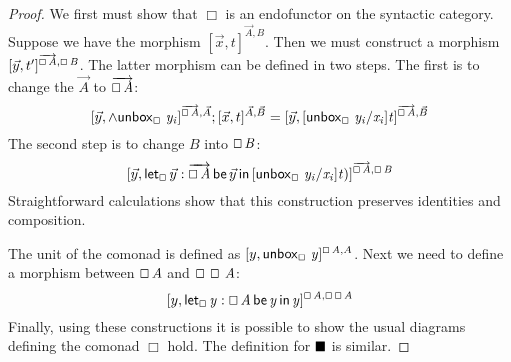 \begin{proof}
  We first must show that $\Box$ is an endofunctor on the syntactic
  category.  Suppose we have the morphism
  $[\vec{x},t]^{\vec{A},B}$.  Then we must construct a morphism
  $[\vec{y},t']^{\overrightarrow{\oblong \, \mathit{A}},\oblong \, \mathit{B}}$.  The latter morphism can be defined in two steps.
  The first is to change the $\vec{A}$ to $\overrightarrow{\oblong \, \mathit{A}}$:
  \[
    [ \vec{y},\wedge \mathsf{unbox}_\oblong\, \, \mathit{y_{\mathit{i}}} ]^{\overrightarrow{\oblong \, \mathit{A}},\vec{A}};[\vec{x},t]^{\vec{A},\vec{B}}
    = [\vec{y}, [ \mathsf{unbox}_\oblong\, \, \mathit{y_{\mathit{i}}}/\mathit{x_{\mathit{i}}} ] \mathit{t} ]^{\overrightarrow{\oblong \, \mathit{A}},\vec{B}}
    \]
    The second step is to change $B$ into $\oblong \, \mathit{B}$:
    \[
      [\vec{y},\mathsf{let}_\oblong\,\vec{y}:\overrightarrow{\oblong \, \mathit{A}}\,\mathsf{be}\,\vec{y}\,\mathsf{in}\,[ \mathsf{unbox}_\oblong\, \, \mathit{y_{\mathit{i}}}/\mathit{x_{\mathit{i}}} ]\mathit{t})]^{\overrightarrow{\oblong \, \mathit{A}},\oblong \, \mathit{B}}
      \]
  Straightforward calculations  show that
  this construction preserves identities and composition.

  The unit of the comonad is defined as $[ y,\mathsf{unbox}_\oblong\, \, \mathit{y} ]^{\oblong \, \mathit{A},A}$.  Next we need to define a morphism between $\oblong \, \mathit{A}$ and $\oblong \, \oblong \, \mathit{A}$:
  \[
  [y, \mathsf{let}_\oblong\, \mathit{y}  :  \oblong \, \mathit{A} \,\mathsf{be}\, \mathit{y} \,\mathsf{in}\, \mathit{y}  ]^{\oblong \, \mathit{A},\oblong \, \oblong \, \mathit{A}}
  \]
  Finally, using these constructions it is possible to show the usual
  diagrams defining the comonad $\Box$ hold.  The definition for
  $\blacksquare$ is similar.
\end{proof}
